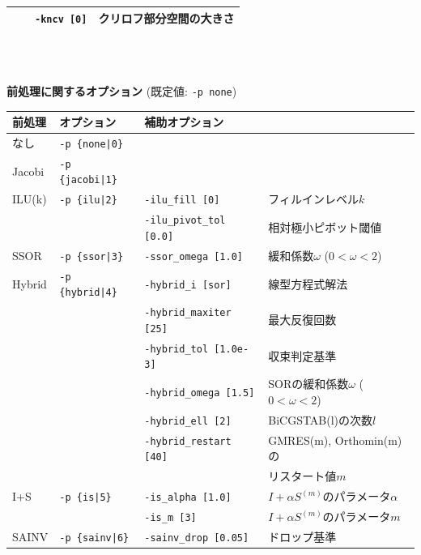 \documentclass[a4paper]{jarticle}
\begin{document}
{{\begin{minipage}[t]{\textwidth}
\begin{center}
\begin{tabular}{l|lll}
                                    &                        &
 \verb=-kncv [0]= & クリロフ部分空間の大きさ \\
\hline         
\end{tabular}
\end{center}
\end{minipage}
\\ \\
\begin{minipage}[t]{\textwidth}
\begin{center}
{\bf 前処理に関するオプション} (既定値: \verb=-p none=) \\
\begin{tabular}{l|lll}\hline\hline
前処理   & オプション           & 補助オプション \\ \hline
なし     & \verb=-p {none|0}=    &   \\
Jacobi   & \verb=-p {jacobi|1}=  &     \\
ILU(k)   & \verb=-p {ilu|2}=     & \verb=-ilu_fill [0]=    & フィルインレベル$k$ \\
         &                       & \verb=-ilu_pivot_tol [0.0]= & 相対極小ピボット閾値 \\
SSOR     & \verb=-p {ssor|3}=    & \verb=-ssor_omega [1.0]=    & 緩和係数$\omega$ ($0<\omega<2$) \\
Hybrid   & \verb=-p {hybrid|4}=  & \verb=-hybrid_i [sor]=  & 線型方程式解法 \\
         &                       & \verb=-hybrid_maxiter [25]= & 最大反復回数 \\
         &                       & \verb=-hybrid_tol [1.0e-3]= & 収束判定基準 \\
         &                       & \verb=-hybrid_omega [1.5]=  & SORの緩和係数$\omega$ ($0<\omega<2$) \\
         &                       & \verb=-hybrid_ell [2]=      & BiCGSTAB(l)の次数$l$\\
         &                       & \verb=-hybrid_restart [40]= & GMRES(m), Orthomin(m)の \\
         &                       &                             & リスタート値$m$ \\
I+S      & \verb=-p {is|5}=      & \verb=-is_alpha [1.0]=  & $I+\alpha S^{(m)}$のパラメータ$\alpha$ \\
         &                       & \verb=-is_m [3]=        & $I+\alpha S^{(m)}$のパラメータ$m$ \\
SAINV    & \verb=-p {sainv|6}=   & \verb=-sainv_drop [0.05]=    & ドロップ基準\\

\end{tabular}
\end{center}
\end{minipage}}}
\end{document}
